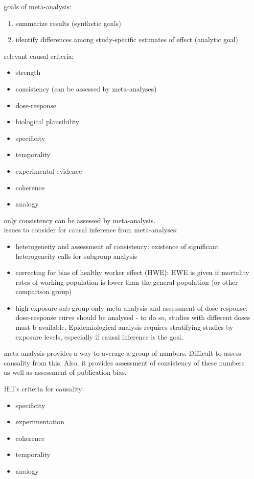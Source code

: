 goals of meta-analysis:
\begin{enumerate}
    \item summarize results (synthetic goals)
    \item identify differences among study-specific estimates of effect (analytic goal)
\end{enumerate}

relevant causal criteria:
\begin{itemize}
    \item strength
    \item consistency (can be assessed by meta-analyses)
    \item dose-response
    \item biological plausibility
    \item specificity
    \item temporality
    \item experimental evidence
    \item coherence
    \item analogy 
\end{itemize}
only consistency can be assessed by meta-analysis.\\

issues to consider for causal inference from meta-analyses:
\begin{itemize}
    \item heterogeneity and assessment of consistency: existence of significant heterogeneity calls for subgroup analysis
    \item correcting for bias of healthy worker effect (HWE): HWE is given if mortality rates of working population is lower than the general population (or other comparison group)
    \item high exposure sub-group only meta-analysis and assessment of dose-response: dose-response curve should be analysed - to do so, studies with different doses must b available. Epidemiological analysis requires stratifying studies by exposure levels, especially if causal inference is the goal.
\end{itemize}

meta-analysis provides a way to average a group of numbers. Difficult to assess causality from this. Also, it provides assessment of consistency of these numbers as well as assessment of publication bias.

Hill's criteria for causality:
\begin{itemize}
    \item specificity
    \item experimentation
    \item coherence
    \item temporality
    \item analogy
\end{itemize}

